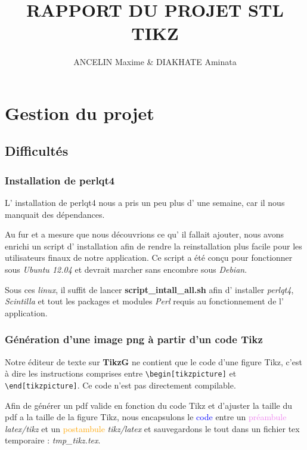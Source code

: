 \documentclass[a4paper]{report}
\title{RAPPORT DU PROJET STL \\ TIKZ}
\author{ANCELIN Maxime & DIAKHATE Aminata}
\begin{document}
 

\newenvironment{violetpar}{\color{violet}}{}
\newenvironment{bluepar}{\par\color{blue}}{\par}
\newenvironment{yellowpar}{\par\color{orange}}{\par}

\tableofcontents
\newpage

\titleformat{\chapter}[hang]{\bf\huge}{\thechapter}{2pc}{} 

\chapter {Gestion du projet}
\section{Difficultés}
\subsection{Installation de perlqt4}
L' installation de perlqt4 nous a pris un peu plus d' une semaine,
car il nous manquait des dépendances.

Au fur et a mesure que nous découvrions ce qu' il fallait ajouter,
nous avons enrichi un script d' installation afin de rendre la reinstallation
plus facile pour les utilisateurs finaux de notre application. Ce
script a été conçu pour fonctionner sous \textit{Ubuntu 12.04} et devrait marcher
sans encombre sous \textit{Debian}.

Sous ces \textit{linux}, il suffit de lancer \textbf{script\_intall\_all.sh}
afin d' installer \textit{perlqt4}, \textit{Scintilla} et tout les packages et modules
\textit{Perl} requis au fonctionnement de l' application.

\subsection{Génération d'une image png à partir d'un code Tikz}
Notre éditeur de texte sur \textbf{TikzG} ne contient que le code d'une figure Tikz, c'est à dire les instructions comprises entre \verb?\begin[tikzpicture]? et \verb?\end[tikzpicture]?. Ce code n'est pas directement compilable.

Afin de générer un pdf valide en fonction du code Tikz et d'ajuster la taille du pdf a la taille de la figure Tikz, nous encapsulons le \textcolor{blue}{code} entre un \textcolor{violet}{préambule} \textit{latex/tikz} et un \textcolor{orange}{postambule} \textit{tikz/latex} et sauvegardons le tout dans un fichier tex temporaire : \textit{tmp\_tikz.tex}.
\end{document}
